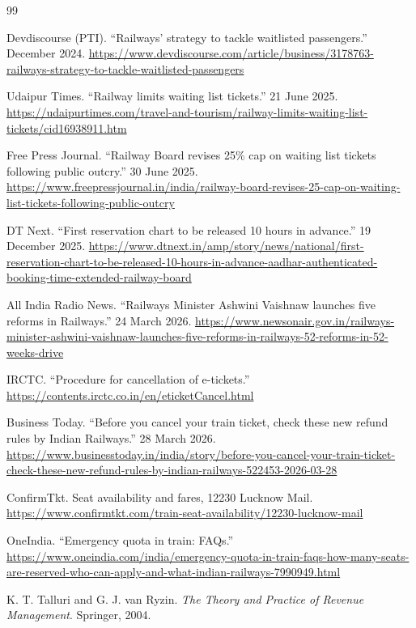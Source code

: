 \documentclass{article}
\theoremstyle{definition}
\begin{document}
\begin{thebibliography}{99}\small

 Devdiscourse (PTI). ``Railways' strategy to tackle waitlisted passengers.''
December 2024. \url{https://www.devdiscourse.com/article/business/3178763-railways-strategy-to-tackle-waitlisted-passengers}

 Udaipur Times. ``Railway limits waiting list tickets.'' 21 June 2025.
\url{https://udaipurtimes.com/travel-and-tourism/railway-limits-waiting-list-tickets/cid16938911.htm}

 Free Press Journal. ``Railway Board revises 25\% cap on waiting list tickets
following public outcry.'' 30 June 2025.
\url{https://www.freepressjournal.in/india/railway-board-revises-25-cap-on-waiting-list-tickets-following-public-outcry}

 DT Next. ``First reservation chart to be released 10 hours in advance.''
19 December 2025.
\url{https://www.dtnext.in/amp/story/news/national/first-reservation-chart-to-be-released-10-hours-in-advance-aadhar-authenticated-booking-time-extended-railway-board}

 All India Radio News. ``Railways Minister Ashwini Vaishnaw launches five
reforms in Railways.'' 24 March 2026.
\url{https://www.newsonair.gov.in/railways-minister-ashwini-vaishnaw-launches-five-reforms-in-railways-52-reforms-in-52-weeks-drive}

 IRCTC. ``Procedure for cancellation of e-tickets.''
\url{https://contents.irctc.co.in/en/eticketCancel.html}

 Business Today. ``Before you cancel your train ticket, check these new
refund rules by Indian Railways.'' 28 March 2026.
\url{https://www.businesstoday.in/india/story/before-you-cancel-your-train-ticket-check-these-new-refund-rules-by-indian-railways-522453-2026-03-28}

 ConfirmTkt. Seat availability and fares, 12230 Lucknow Mail.
\url{https://www.confirmtkt.com/train-seat-availability/12230-lucknow-mail}

 OneIndia. ``Emergency quota in train: FAQs.''
\url{https://www.oneindia.com/india/emergency-quota-in-train-faqs-how-many-seats-are-reserved-who-can-apply-and-what-indian-railways-7990949.html}

 K. T. Talluri and G. J. van Ryzin. \emph{The Theory and Practice of
Revenue Management}. Springer, 2004.

\end{thebibliography}
\end{document}

